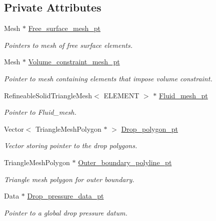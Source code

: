 \subsection*{Private Attributes}
\begin{DoxyCompactItemize}
\item 
Mesh $\ast$ \hyperlink{classDropInChannelProblem_a6de0bac4bc483d500aa215a59bbf25bc}{Free\+\_\+surface\+\_\+mesh\+\_\+pt}
\begin{DoxyCompactList}\small\item\em Pointers to mesh of free surface elements. \end{DoxyCompactList}\item 
Mesh $\ast$ \hyperlink{classDropInChannelProblem_ac5f5480fe22c40a175a0b5c0ce39fa05}{Volume\+\_\+constraint\+\_\+mesh\+\_\+pt}
\begin{DoxyCompactList}\small\item\em Pointer to mesh containing elements that impose volume constraint. \end{DoxyCompactList}\item 
Refineable\+Solid\+Triangle\+Mesh$<$ E\+L\+E\+M\+E\+NT $>$ $\ast$ \hyperlink{classDropInChannelProblem_a1f16a75afe9aad09be325d409a4a1b0d}{Fluid\+\_\+mesh\+\_\+pt}
\begin{DoxyCompactList}\small\item\em Pointer to Fluid\+\_\+mesh. \end{DoxyCompactList}\item 
Vector$<$ Triangle\+Mesh\+Polygon $\ast$ $>$ \hyperlink{classDropInChannelProblem_abccd5c5d075bf179150c3d0df25dcea9}{Drop\+\_\+polygon\+\_\+pt}
\begin{DoxyCompactList}\small\item\em Vector storing pointer to the drop polygons. \end{DoxyCompactList}\item 
Triangle\+Mesh\+Polygon $\ast$ \hyperlink{classDropInChannelProblem_aebc1a038a715fd269319b1fb091f0b26}{Outer\+\_\+boundary\+\_\+polyline\+\_\+pt}
\begin{DoxyCompactList}\small\item\em Triangle mesh polygon for outer boundary. \end{DoxyCompactList}\item 
Data $\ast$ \hyperlink{classDropInChannelProblem_ada417f705745bf3e6612f5a9a0a5ef78}{Drop\+\_\+pressure\+\_\+data\+\_\+pt}
\begin{DoxyCompactList}\small\item\em Pointer to a global drop pressure datum. \end{DoxyCompactList}\item 

\end{DoxyCompactItemize}
